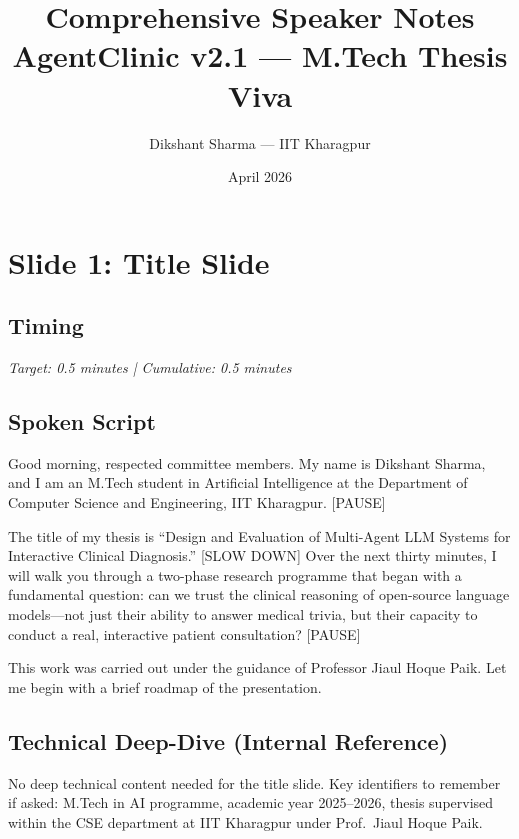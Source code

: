 \documentclass[12pt]{article}
\title{Comprehensive Speaker Notes\\AgentClinic v2.1 --- M.Tech Thesis Viva}
\author{Dikshant Sharma --- IIT Kharagpur}
\date{April 2026}
\begin{document}
  \maketitle
  \tableofcontents
  \newpage

  \section{Slide 1: Title Slide}

  \subsection*{Timing}
  \textit{Target: 0.5 minutes | Cumulative: 0.5 minutes}

  \subsection*{Spoken Script}
  \begin{spokenbox}
  Good morning, respected committee members. My name is Dikshant Sharma, and I am an M.Tech student in Artificial Intelligence at the Department of Computer Science and Engineering, IIT Kharagpur. [PAUSE]

  The title of my thesis is ``Design and Evaluation of Multi-Agent LLM Systems for Interactive Clinical Diagnosis.'' [SLOW DOWN] Over the next thirty minutes, I will walk you through a two-phase research programme that began with a fundamental question: can we trust the clinical reasoning of open-source language models---not just their ability to answer medical trivia, but their capacity to conduct a real, interactive patient consultation? [PAUSE]

  This work was carried out under the guidance of Professor Jiaul Hoque Paik. Let me begin with a brief roadmap of the presentation.
  \end{spokenbox}

  \subsection*{Technical Deep-Dive (Internal Reference)}
  {\color{techgray}
  No deep technical content needed for the title slide. Key identifiers to remember if asked: M.Tech in AI programme, academic year 2025--2026, thesis supervised within the CSE department at IIT Kharagpur under Prof.\ Jiaul Hoque Paik.
  }
\end{document}

